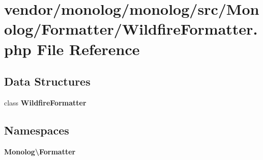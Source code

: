 \section{vendor/monolog/monolog/src/\+Monolog/\+Formatter/\+Wildfire\+Formatter.php File Reference}
\label{_wildfire_formatter_8php}
\subsection*{Data Structures}
\begin{DoxyCompactItemize}
\item 
class {\bf Wildfire\+Formatter}
\end{DoxyCompactItemize}
\subsection*{Namespaces}
\begin{DoxyCompactItemize}
\item 
 {\bf Monolog\textbackslash{}\+Formatter}
\end{DoxyCompactItemize}

